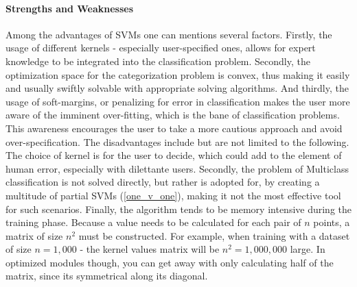 	\paragraph{Strengths and Weaknesses}
		Among the advantages of SVMs one can mentions several factors. Firstly, the usage of different kernels - especially user-specified ones, allows for expert knowledge to be integrated into the classification problem. Secondly, the optimization space for the categorization problem is convex, thus making it easily and usually swiftly solvable with appropriate solving algorithms. And thirdly, the usage of soft-margins, or penalizing for error in classification makes the user more aware of the imminent over-fitting, which is the bane of classification problems. This awareness encourages the user to take a more cautious approach and avoid over-specification. The disadvantages include but are not limited to the following. The choice of kernel is for the user to decide, which could add to the element of human error, especially with dilettante users. Secondly, the problem of Multiclass classification is not solved directly, but rather is adopted for, by creating a multitude of partial SVMs (\ref{one_v_one}), making it not the most effective tool for such scenarios. Finally, the algorithm tends to be memory intensive during the training phase. Because a value needs to be calculated for each pair of $n$ points, a matrix of size $n^2$ must be constructed. For example, when training with a dataset of size $n = 1,000$ - the kernel values matrix will be $n^2 = 1,000,000$ large. In optimized modules though, you can get away with only calculating half of the matrix, since its symmetrical along its diagonal.
